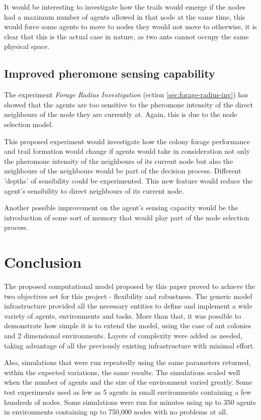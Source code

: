 It would be interesting to investigate how the trails would emerge if the nodes had a maximum number of agents allowed in that node at the same time, this would force some agents to move to nodes they would not move to otherwise, it is clear that this is the actual case in nature, as two ants cannot occupy the same physical space. 

\subsection{Improved pheromone sensing capability}

The experiment \emph{Forage Radius Investigation} (ection \ref{sec:forage-radius-inv}) has showed that the agents are too sensitive to the pheromone intensity of the direct neighbours of the node they are currently at. Again, this is due to the node selection model.

This proposed experiment would investigate how the colony forage performance and trail formation would change if agents would take in consideration not only the pheromone intensity of the neighbours of its current node but also the neighbours of the neighbours would be part of the decision process. Different 'depths' of sensibility could be experimented. This new feature would reduce the agent's sensibility to direct neighbours of its current node. 

Another possible improvement on the agent's sensing capacity would be the introduction of some sort of memory that would play part of the node selection process.

\section{Conclusion}

The proposed computational model proposed by this paper proved to achieve the two objectives set for this project - flexibility and robustness. The generic model infrastructure provided all the necessary entities to define and implement a wide variety of agents, environments and tasks. More than that, it was possible to demonstrate how simple it is to extend the model, using the case of ant colonies and 2 dimensional environments. Layers of complexity were added as needed, taking advantage of all the previously existing infrastructure with minimal effort.

Also, simulations that were run repeatedly using the same parameters returned, within the expected variations, the same results. The simulations scaled well when the number of agents and the size of the environment varied greatly. Some test experiments used as few as 5 agents in small environments containing a few hundreds of nodes. Some simulations were run for minutes using up to 350 agents in environments containing up to 750,000 nodes with no problems at all.

